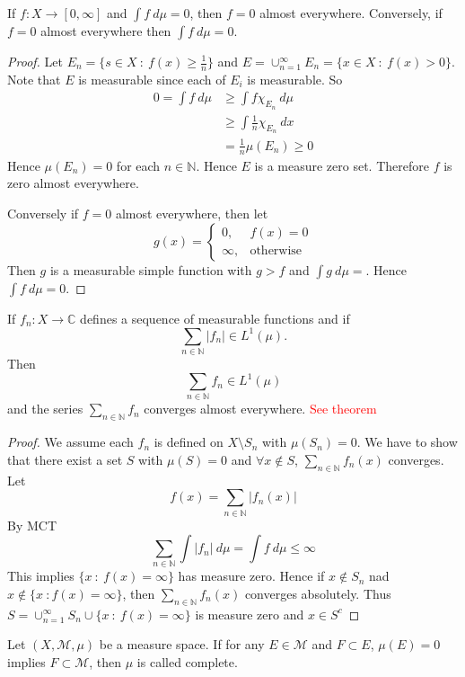 \begin{theorem}
  If $f: X \to [0, \infty]$ and $\int  f \ d \mu = 0$, then $f = 0$ almost everywhere. Conversely, if $ f = 0$ almost everywhere then $\int  f \ d \mu = 0$.
\end{theorem}
\begin{proof}
  Let $E_n = \{ s \in X \ : \ f(x) \ge \frac{1}{n} \}$ and $E = \cup_{n = 1}^{\infty}E_n = \{  x \in X \ : \ f(x) > 0 \}$. Note that $E$ is measurable since each of $E_i$ is measurable.
  So \begin{align*}
    0 = \int f \ d \mu & \ge \int f \chi_{E_n} \ d \mu \\ 
    & \ge \int \frac{1}{n}\chi_{E_n} \ dx \\ 
    &= \frac{1}{n} \mu(E_n) \ge 0
    \end{align*}
  Hence $\mu(E_n) = 0$ for each $n \in \mathbb{N}$. Hence $E$ is a measure zero set. Therefore $f$ is zero almost everywhere.

  Conversely if $f = 0$ almost everywhere, then let \[
    g(x) = \begin{cases}
      0, & f(x) = 0 \\
      \infty, & \textrm{otherwise}
    \end{cases}
  \]
  Then $g$ is a measurable simple function with $g > f$ and $\int g \ d \mu = $. Hence $ \int f \ d\mu = 0$.
\end{proof}

\begin{theorem}
  If $f_n: X \to \mathbb{C}$ defines a sequence of measurable functions and if \[
    \sum_{n \in \mathbb{N}} |f_n| \in L^1(\mu). 
  \]
  Then \[
    \sum_{n \in \mathbb{N}} f_n \in L^1(\mu)
  \]
  and the series $\sum_{n \in \mathbb{N}} f_n$ converges almost everywhere.
  \textcolor{red}{See theorem}
\end{theorem}
\begin{proof}
  We assume each $f_n$ is defined on $X \setminus S_n$ with $\mu(S_n) = 0$. We have to show that there exist a set $S$ with $\mu(S) = 0$ and $\forall x \notin S$,  $\sum_{n \in \mathbb{N}} f_n(x)$ converges.
  Let \[
    f(x) = \sum_{n \in \mathbb{N}} |f_n(x)|
  \]
  By MCT \[
      \sum_{n \in \mathbb{N}} \int |f_n| \ d \mu = \int f \ d\mu \le \infty
  \]
  This implies $\{ x \ : \ f(x) = \infty \}$ has measure zero. Hence if $x \notin S_n$ nad $x \notin \{ x \ : f(x) = \infty \}$, then $ \sum_{n \in \mathbb{N}} f_n(x)$ converges absolutely. Thus $S = \cup_{n = 1}^{\infty}S_n \cup \{ x \ : \ f(x) = \infty \}$ is measure zero and $ x \in S^c$
\end{proof}

\begin{definition}
  Let $(X, \mathcal{M}, \mu)$ be a measure space. If for any $E \in \mathcal{M}$ and $F \subset E$, $\mu(E) = 0$ implies $F \subset \mathcal{M}$, then $\mu$ is called complete.
\end{definition}





